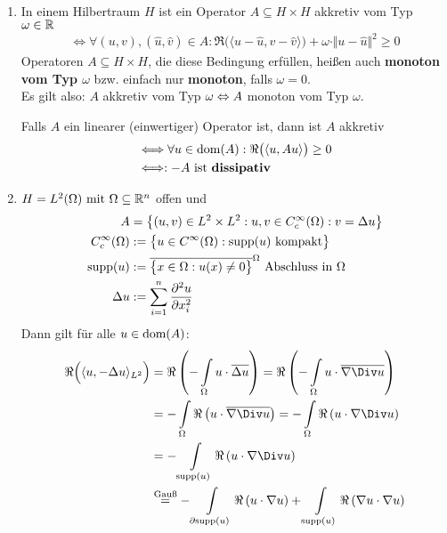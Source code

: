 \begin{beispiel}\
\begin{enumerate}[label=(\alph*)]
\item In einem Hilbertraum $H$ ist ein Operator $A\subseteq H\times H$ akkretiv vom Typ $\omega\in\mathbb{R}$
\begin{align*}
\Longleftrightarrow\forall(u,v),(\hat{u},\hat{v})\in A:
 \Re\big(\langle u-\hat{u},v-\hat{v}\rangle\big)+\omega\cdot\Vert u-\hat{u}\Vert^2\geq0
\end{align*}
Operatoren $A\subseteq H\times H$, die diese Bedingung erfüllen, heißen auch \textbf{monoton vom Typ $\omega$} bzw. einfach nur \textbf{monoton}, falls $\omega=0$.\\
Es gilt also: $A$ akkretiv vom Typ $\omega\Leftrightarrow A$ monoton vom Typ $\omega$.

Falls $A$ ein linearer (einwertiger) Operator ist, dann ist $A$ akkretiv
\begin{align*}
&\Longleftrightarrow\forall u\in\text{dom}(A):\Re\big(\langle u, Au\rangle\big)\geq0\\
&\Longleftrightarrow: -A\text{ ist \textbf{dissipativ}}
\end{align*}
\item $H=L^2(\Omega)\text{ mit }\Omega\subseteq\mathbb{R}^n$ offen und 
\begin{align*}
A&=\big\lbrace(u,v)\in L^2\times L^2:u,v\in C_c^\infty(\Omega):v=\Delta u\big\rbrace\\
C_c^\infty(\Omega)&:=\big\lbrace u\in C^\infty(\Omega):\text{supp}(u)\text{ kompakt}\big\rbrace\\
\text{supp}(u)&:=\overline{\big\lbrace x\in\Omega:u(x)\neq0\big\rbrace}^\Omega\text{ Abschluss in }\Omega\\
\Delta u&:=\sum\limits_{i=1}^n\frac{\partial^2 u}{\partial x_i^2}
\end{align*}
Dann gilt für alle $u\in\text{dom}(A)$:
\begin{align*}
\Re\Big(\langle u,-\Delta u\rangle_{L^2}\Big) 
&= \Re\left(-\int\limits_\Omega u\cdot\overline{\Delta u}\right) = \Re\left(-\int\limits_\Omega u\cdot\overline{\nabla \Div u}\right)\\
&= -\int\limits_\Omega \Re \left(u\cdot\overline{\nabla \Div u}\right) = -\int\limits_\Omega \Re \left(u\cdot\nabla \Div u\right)\\
&= -\int\limits_{\supp(u)} \Re \left(u\cdot\nabla \Div u\right)\\
&\stackeq{\text{Gauß}}
-\int\limits_{\partial\supp(u)} \Re \left(u\cdot\nabla u\right) + \int\limits_{\supp(u)} \Re \left(\nabla u\cdot\nabla u\right)\\

\end{align*}
\end{enumerate}
\end{beispiel}
